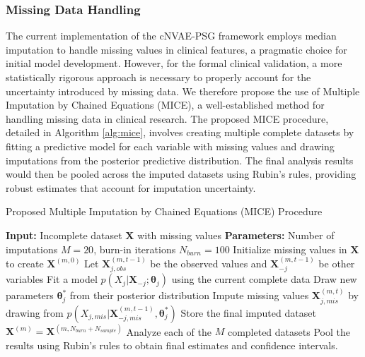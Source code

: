 \documentclass[10pt, conference]{IEEEtran}
\begin{document}
\subsubsection{Missing Data Handling}
The current implementation of the cNVAE-PSG framework employs median imputation to handle missing values in clinical features, a pragmatic choice for initial model development. However, for the formal clinical validation, a more statistically rigorous approach is necessary to properly account for the uncertainty introduced by missing data. We therefore propose the use of Multiple Imputation by Chained Equations (MICE), a well-established method for handling missing data in clinical research. The proposed MICE procedure, detailed in Algorithm \ref{alg:mice}, involves creating multiple complete datasets by fitting a predictive model for each variable with missing values and drawing imputations from the posterior predictive distribution. The final analysis results would then be pooled across the imputed datasets using Rubin's rules, providing robust estimates that account for imputation uncertainty.

\begin{algorithm}[H]
\caption{Proposed Multiple Imputation by Chained Equations (MICE) Procedure}
\label{alg:mice}
\begin{algorithmic}[1]
\STATE \textbf{Input:} Incomplete dataset $\mathbf{X}$ with missing values
\STATE \textbf{Parameters:} Number of imputations $M=20$, burn-in iterations $N_{burn}=100$
    \STATE Initialize missing values in $\mathbf{X}$ to create $\mathbf{X}^{(m,0)}$
            \STATE Let $\mathbf{X}_{j,obs}^{(m,t-1)}$ be the observed values and $\mathbf{X}_{-j}^{(m,t-1)}$ be other variables
            \STATE Fit a model $p(X_j | \mathbf{X}_{-j}; \boldsymbol{\theta}_j)$ using the current complete data
            \STATE Draw new parameters $\boldsymbol{\theta}_j^*$ from their posterior distribution
            \STATE Impute missing values $\mathbf{X}_{j,mis}^{(m,t)}$ by drawing from $p(X_{j,mis} | \mathbf{X}_{-j,mis}^{(m,t-1)}, \boldsymbol{\theta}_j^*)$
        \ENDFOR
    \ENDFOR
    \STATE Store the final imputed dataset $\mathbf{X}^{(m)} = \mathbf{X}^{(m, N_{burn}+N_{sample})}$
\ENDFOR
\STATE Analyze each of the $M$ completed datasets
\STATE Pool the results using Rubin's rules to obtain final estimates and confidence intervals.
\end{algorithmic}
\end{algorithm}
\end{document}
